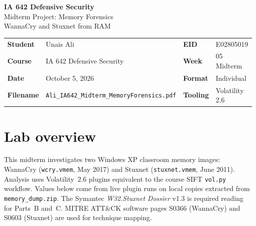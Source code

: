 \documentclass[11pt,letterpaper]{article}
\begin{document}
\begin{center}
{\LARGE\bfseries IA 642 Defensive Security}\\[0.25em]
{\Large Midterm Project: Memory Forensics}\\[0.15em]
{\large WannaCry and Stuxnet from RAM}\\[0.3em]
\end{center}

\begin{tabularx}{\textwidth}{@{}l Y l l@{}}
\toprule
\textbf{Student} & Unais Ali & \textbf{EID} & E02805019 \\
\textbf{Course} & IA 642 Defensive Security & \textbf{Week} & 05 Midterm \\
\textbf{Date} & October 5, 2026 & \textbf{Format} & Individual \\
\textbf{Filename} & \texttt{Ali\_IA642\_Midterm\_MemoryForensics.pdf} & \textbf{Tooling} & Volatility 2.6 \\
\bottomrule
\end{tabularx}

\vspace{0.5em}
\section*{Lab overview}
This midterm investigates two Windows XP classroom memory images: WannaCry (\texttt{wcry.vmem}, May 2017)
and Stuxnet (\texttt{stuxnet.vmem}, June 2011). Analysis uses Volatility~2.6 plugins equivalent to the course SIFT
\texttt{vol.py} workflow. Values below come from live plugin runs on local copies extracted from
\texttt{memory\_dump.zip}. The Symantec \textit{W32.Stuxnet Dossier} v1.3 is required reading for Parts~B and~C.
MITRE ATT\&CK software pages S0366 (WannaCry) and S0603 (Stuxnet) are used for technique mapping.
\end{document}
